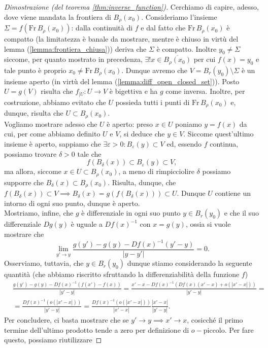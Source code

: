 \begin{proof}[Dimostrazione (del teorema \ref{thm:inverse_function})]
	Cerchiamo di capire, adesso, dove viene mandata la frontiera di $B_\rho(x_0)$. Consideriamo l'insieme $\Sigma = f(\text{Fr} \, B_\rho(x_0))$: dalla continuità di $f$ e dal fatto che $\text{Fr} \, B_\rho(x_0)$ è compatto (la limitatezza è banale da mostrare, mentre è chiuso in virtù del lemma (\ref{lemma:frontiera_chiusa})) deriva che $\Sigma$ è compatto. Inoltre
    $y_0 \neq \Sigma$ siccome, per quanto mostrato in precedenza, $\exists ! x \in \overline{B_\rho(x_0)}$ per cui $f(x) = y_0$ e tale punto è proprio $x_0 \neq \text{Fr} \, B_\rho(x_0)$. Dunque avremo che $V = B_r(y_0) \setminus \Sigma$ è un insieme aperto (in virtù del lemma (\ref{lemma:diff_open_closed_set})). Posto $U = g(V)$ risulta che $f_{|U} : U \to V$ è bigettiva
    e ha $g$ come inversa. Inoltre, per costruzione, abbiamo evitato che $U$ possieda tutti i punti di $\text{Fr} \, B_\rho(x_0)$ e, dunque, risulta che $U \subset B_\rho(x_0)$. \\
    Vogliamo mostrare adesso che $U$ è aperto: preso $x \in U$ poniamo $y = f(x)$ da cui, per come abbiamo definito $U$ e $V$, si deduce che $y \in V$. Siccome quest'ultimo insieme è aperto, sappiamo che $\exists \varepsilon > 0: B_\varepsilon(y) \subset V$ ed, essendo $f$ continua, possiamo trovare $\delta > 0$ tale che
    $$
    f(B_\delta(x)) \subset B_\varepsilon(y) \subset V,
    $$
    ma allora, siccome $x \in U \subset B_\rho(x_0)$, a meno di rimpicciolire $\delta$ possiamo supporre che $B_\delta(x) \subset B_\rho(x_0)$. Risulta, dunque, che $f(B_\delta(x)) \subset V \implies B_\delta(x) = g(f(B_\delta(x))) \subset U$. Dunque $U$ contiene un intorno di ogni suo punto, dunque è aperto. \\
    Mostriamo, infine, che $g$ è differenziale in ogni suo punto $y \in B_r(y_0)$ e che il suo differenziale $Dg(y)$ è uguale a $Df(x)^{-1}$ con $x = g(y)$, ossia si vuole mostrare che
    $$
        \lim_{y' \to y} \frac{g(y') - g(y) - Df(x)^{-1}(y'-y)}{|y-y'|} = 0.
    $$
    Osserviamo, tuttavia, che $y \in B_r(y_0)$ dunque stiamo considerando la seguente quantità (che abbiamo riscritto sfruttando la differenziabilità della funzione $f$)
    \begin{align*}
    &\frac{g(y') - g(y) - Df(x)^{-1}(f(x')-f(x))}{|y' - y|} = \frac{x' - x - Df(x)^{-1}(Df(x)(x'-x) + o(|x' - x|))}{|y' - y|} = \\
    &=\frac{Df(x)^{-1}(o(|x'-x|))}{|y'-y|} = \frac{Df(x)^{-1}(o(|x'-x|))}{|x'-x|} \frac{|x'-x|}{|y'-y|}.
    \end{align*}
    Per concludere, ci basta mostrare che se $y' \to y \implies x' \to x$, cosicché il primo termine dell'ultimo prodotto tende a zero per definizione di $o-$piccolo. Per fare questo, possiamo riutilizzare

\end{proof}

